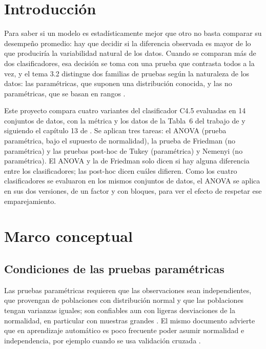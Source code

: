 \documentclass[11pt,letterpaper]{article}
\begin{document}
\portada
\indicegeneral


\section{Introducción}

Para saber si un modelo es estadísticamente mejor que otro no basta comparar su desempeño promedio: hay que decidir si la diferencia observada es mayor de lo que produciría la variabilidad natural de los datos. Cuando se comparan más de dos clasificadores, esa decisión se toma con una prueba que contrasta todos a la vez, y el tema 3.2 distingue dos familias de pruebas según la naturaleza de los datos: las paramétricas, que suponen una distribución conocida, y las no paramétricas, que se basan en rangos \parencite{tecnm2026_tema32}.

Este proyecto compara cuatro variantes del clasificador C4.5 evaluadas en 14 conjuntos de datos, con la métrica y los datos de la Tabla~6 del trabajo de \textcite{demsar2006} y siguiendo el capítulo 13 de \textcite{walpole2007}. Se aplican tres tareas: el ANOVA (prueba paramétrica, bajo el supuesto de normalidad), la prueba de Friedman (no paramétrica) y las pruebas post-hoc de Tukey (paramétrica) y Nemenyi (no paramétrica). El ANOVA y la de Friedman solo dicen si hay alguna diferencia entre los clasificadores; las post-hoc dicen cuáles difieren. Como los cuatro clasificadores se evaluaron en los mismos conjuntos de datos, el ANOVA se aplica en sus dos versiones, de un factor y con bloques, para ver el efecto de respetar ese emparejamiento.

\section{Marco conceptual}

\subsection{Condiciones de las pruebas paramétricas}

Las pruebas paramétricas requieren que las observaciones sean independientes, que provengan de poblaciones con distribución normal y que las poblaciones tengan varianzas iguales; son confiables aun con ligeras desviaciones de la normalidad, en particular con muestras grandes \parencite{tecnm2026_tema32}. El mismo documento advierte que en aprendizaje automático es poco frecuente poder asumir normalidad e independencia, por ejemplo cuando se usa validación cruzada \parencite{tecnm2026_tema32}.
\end{document}
